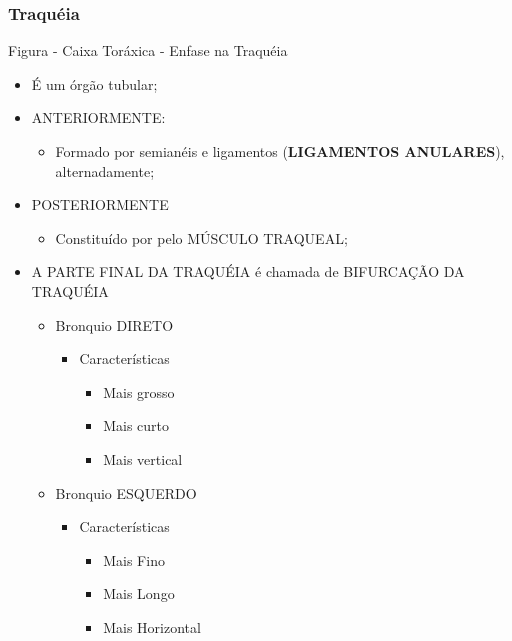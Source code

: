 \documentclass[
]{book}
\providecommand{\tightlist}{%
  \setlength{\itemsep}{0pt}\setlength{\parskip}{0pt}}
\begin{document}
\hypertarget{traquuxe9ia}{%
\subsubsection{Traquéia}\label{traquuxe9ia}}

Figura - Caixa Toráxica - Enfase na Traquéia

\begin{itemize}
\tightlist
\item
  É um órgão tubular;
\item
  ANTERIORMENTE:

  \begin{itemize}
  \tightlist
  \item
    Formado por semianéis e ligamentos (\textbf{LIGAMENTOS ANULARES}), alternadamente;
  \end{itemize}
\item
  POSTERIORMENTE

  \begin{itemize}
  \tightlist
  \item
    Constituído por pelo MÚSCULO TRAQUEAL;
  \end{itemize}
\item
  A PARTE FINAL DA TRAQUÉIA é chamada de BIFURCAÇÃO DA TRAQUÉIA

  \begin{itemize}
  \tightlist
  \item
    Bronquio DIRETO

    \begin{itemize}
    \tightlist
    \item
      Características

      \begin{itemize}
      \tightlist
      \item
        Mais grosso
      \item
        Mais curto
      \item
        Mais vertical
      \end{itemize}
    \end{itemize}
  \item
    Bronquio ESQUERDO

    \begin{itemize}
    \tightlist
    \item
      Características

      \begin{itemize}
      \tightlist
      \item
        Mais Fino
      \item
        Mais Longo
      \item
        Mais Horizontal
      \end{itemize}
    \end{itemize}
  \end{itemize}
\end{itemize}
\end{document}
